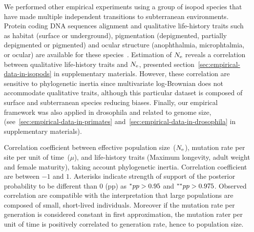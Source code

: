 We performed other empirical experiments using a group of isopod species that have made multiple independent transitions to subterranean environments.
Protein coding DNA sequences alignment and qualitative life-history traits such as habitat (surface or underground), pigmentation (depigmented, partially depigmented or pigmented) and ocular structure (anophthalmia, microphtalmia, or ocular) are available for these species~\citep{Saclier2018}.
Estimation of $N_{\mathrm{e}}$ reveals a correlation between qualitative life-history traits and $N_{\mathrm{e}}$, presented section~\ref{sec:empirical-data-in-isopods} in supplementary materials.
However, these correlation are sensitive to phylogenetic inertia since multivariate log-Brownian does not accommodate qualitative traits, although this particular dataset is composed of surface and subterranean species reducing biases.
Finally, our empirical framework was also applied in drosophila and related to genome size,  (see~\ref{sec:empirical-data-in-primates} and~\ref{sec:empirical-data-in-drosophila} in supplementary materials).

\begin{table}[htbp]
    
    \caption[Traits correlation]{
    Correlation coefficient between effective population size~($N_{\mathrm{e}}$), mutation rate per site per unit of time~($\mu$), and life-history traits (Maximum longevity, adult weight and female maturity), taking account phylogenetic inertia.
    Correlation coefficient are between $-1$ and $1$.
    Asterisks indicate strength of support of the posterior probability to be different than $0$ (pp) as $\smash{^{*}} pp > 0.95$ and $\smash{^{**}} pp > 0.975$.
    Observed correlation are compatible with the interpretation that large populations are composed of small, short-lived individuals.
    Moreover if the mutation rate per generation is considered constant in first approximation, the mutation rater per unit of time is positively correlated to generation rate, hence to population size.
    }
    \label{fig:mammals_correlation}
\end{table}



